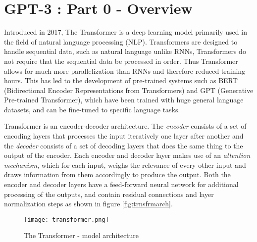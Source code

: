 \chapter*{GPT-3 : Part 0 - Overview}
\label{chap:gpt3overview}
\thispagestyle{fancy}

\hspace{0.5cm} Introduced in 2017, The Transformer is a deep learning model primarily used in the field of natural language processing (NLP). Transformers are designed to handle sequential data, such as natural language unlike RNNs, Transformers do not require that the sequential data be processed in order. Thus Transformer allows for much more parallelization than RNNs and therefore reduced training hours. This has led to the development of pre-trained systems such as BERT (Bidirectional Encoder Representations from Transformers) and GPT (Generative Pre-trained Transformer), which have been trained with huge general language datasets, and can be fine-tuned to specific language tasks.

Transformer is an encoder-decoder architecture. The \emph{encoder} consists of a set of encoding layers that processes the input iteratively one layer after another and the \emph{decoder} consists of a set of decoding layers that does the same thing to the output of the encoder. Each encoder and decoder layer makes use of an \emph{attention mechanism}, which for each input, weighs the relevance of every other input and draws information from them accordingly to produce the output. Both the encoder and decoder layers have a feed-forward neural network for additional processing of the outputs, and contain residual connections and layer normalization steps \cite{wiki:transformer} as shown in figure \eqref{fig:trnsfrmarch}.

\begin{figure}[!htbp]
    \centering
    \texttt{[image: transformer.png]}
    \caption[The Transformer - model architecture]{The Transformer - model architecture \cite{2017arXiv170603762V}}
    \label{fig:trnsfrmarch}
\end{figure}
\vspace*{\fill}

